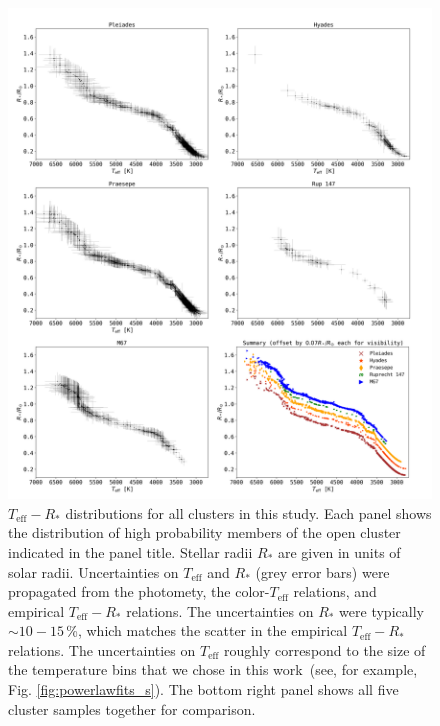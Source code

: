 \documentclass{aa}
\begin{document}
   \begin{figure}
		\centering
           \includegraphics[width=1.015\hsize]{pics/clusters/teff_R.png}

      \caption{$T_\mathrm{eff}-R_*$ distributions for all clusters in this study. Each panel shows the distribution of high probability members of the open cluster indicated in the panel title. Stellar radii $R_*$ are given in units of solar radii. Uncertainties on $T_\mathrm{eff}$ and $R_*$ (grey error bars) were propagated from the photomety, the color-$T_\mathrm{eff}$ relations, and empirical $T_\mathrm{eff}-R_*$ relations. The uncertainties on $R_*$ were typically $\sim10-15$\,\%, which matches the scatter in the empirical $T_\mathrm{eff}-R_*$ relations. The uncertainties on $T_\mathrm{eff}$ roughly correspond to the size of the temperature bins that we chose in this work~(see, for example, Fig. \ref{fig:powerlawfits_s}). The bottom right panel shows all five cluster samples together for comparison.}
         \label{fig:teff_radius}
         
   \end{figure}

   
\end{document}
